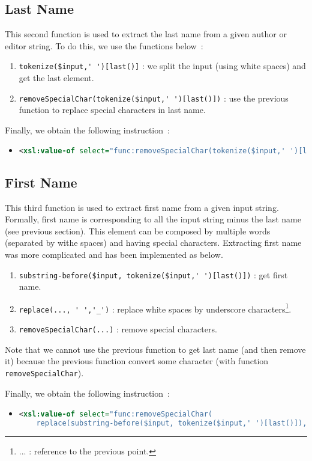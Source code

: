 \documentclass{article}
\begin{document}
  \subsection{Last Name} 
    This second function is used to extract the last name from a given author or editor string. To do this, we use the functions below~:
    \begin{enumerate}
      \item \verb|tokenize($input,' ')[last()]| : we split the input (using white spaces) and get the last element.
      \item \verb|removeSpecialChar(tokenize($input,' ')[last()])| : use the previous function to replace special characters in last name.
    \end{enumerate}
    Finally, we obtain the following instruction~:
    \begin{itemize}
      \item \begin{lstlisting}[language=XML]
<xsl:value-of select="func:removeSpecialChar(tokenize($input,' ')[last()])"/>\end{lstlisting}
    \end{itemize}

  \subsection{First Name} 
    This third function is used to extract first name from a given input string. Formally, first name is corresponding to all the input string minus the last name (see previous section). This element can be composed by multiple words (separated by withe spaces) and having special characters. Extracting first name was more complicated and has been implemented as below.
    \begin{enumerate}
      \item \verb|substring-before($input, tokenize($input,' ')[last()])| : get first name.
      \item \verb|replace(..., ' ','_')| : replace white spaces by underscore characters\footnote{ ... : reference to the previous point.}.
      \item \verb|removeSpecialChar(...)| : remove special characters.
    \end{enumerate}
    Note that we cannot use the previous function to get last name (and then remove it) because the previous function convert some character (with function \verb|removeSpecialChar|).
    
    Finally, we obtain the following instruction~:
    \begin{itemize}
      \item \begin{lstlisting}[language=XML]
<xsl:value-of select="func:removeSpecialChar(
    replace(substring-before($input, tokenize($input,' ')[last()]), ' ' ,'_'))"/>\end{lstlisting}
    \end{itemize}
\end{document}
